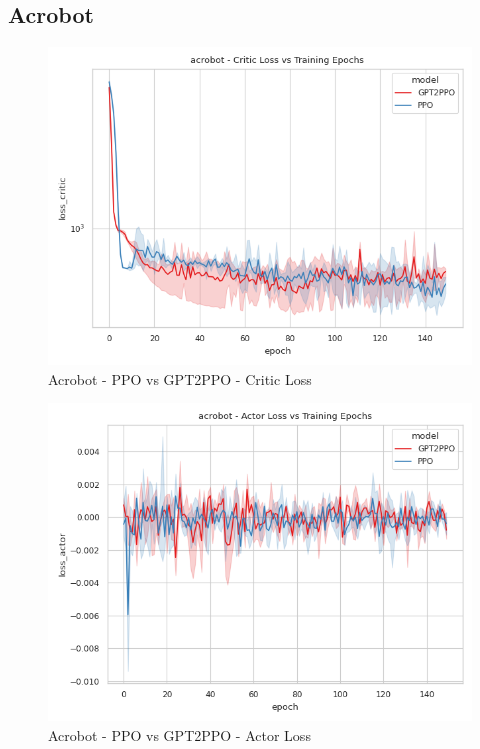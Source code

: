 \subsection{Acrobot}

\begin{figure}[htbp]
    \centerline{\includegraphics[width=\columnwidth]{./img/acrobot-loss_critic-model.png}}
    \caption{Acrobot - PPO vs GPT2PPO - Critic Loss}
    \label{acrobot-loss_critic-model}
\end{figure}

\begin{figure}[htbp]
    \centerline{\includegraphics[width=\columnwidth]{./img/acrobot-loss_actor-model.png}}
    \caption{Acrobot - PPO vs GPT2PPO - Actor Loss}
    \label{acrobot-loss_actor-model}
\end{figure}

